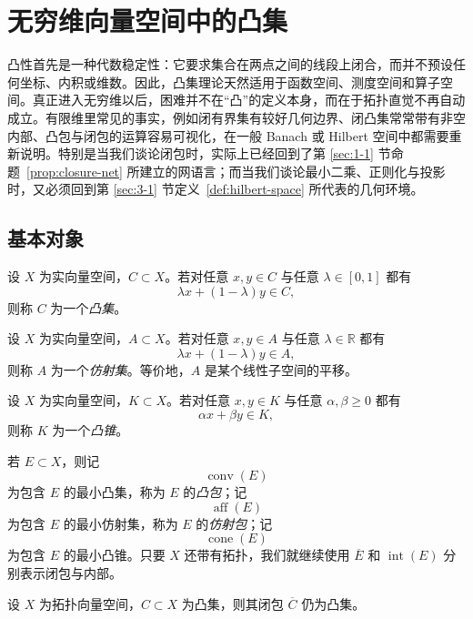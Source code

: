\section{无穷维向量空间中的凸集}

\label{sec:4-1}

凸性首先是一种代数稳定性：它要求集合在两点之间的线段上闭合，而并不预设任何坐标、内积或维数。因此，凸集理论天然适用于函数空间、测度空间和算子空间。真正进入无穷维以后，困难并不在“凸”的定义本身，而在于拓扑直觉不再自动成立。有限维里常见的事实，例如闭有界集有较好几何边界、闭凸集常常带有非空内部、凸包与闭包的运算容易可视化，在一般 Banach 或 Hilbert 空间中都需要重新说明。特别是当我们谈论闭包时，实际上已经回到了第 \ref{sec:1-1} 节命题~\ref{prop:closure-net} 所建立的网语言；而当我们谈论最小二乘、正则化与投影时，又必须回到第 \ref{sec:3-1} 节定义~\ref{def:hilbert-space} 所代表的几何环境。

\subsection{基本对象}

\begin{definition}[凸集]\label{def:convex-set}
设 $X$ 为实向量空间，$C\subset X$。若对任意 $x,y\in C$ 与任意 $\lambda\in[0,1]$ 都有
\[
\lambda x+(1-\lambda)y\in C,
\]
则称 $C$ 为一个\emph{凸集}。
\end{definition}

\begin{definition}[仿射集]\label{def:affine-set}
设 $X$ 为实向量空间，$A\subset X$。若对任意 $x,y\in A$ 与任意 $\lambda\in\mathbb R$ 都有
\[
\lambda x+(1-\lambda)y\in A,
\]
则称 $A$ 为一个\emph{仿射集}。等价地，$A$ 是某个线性子空间的平移。
\end{definition}

\begin{definition}[凸锥]\label{def:convex-cone}
设 $X$ 为实向量空间，$K\subset X$。若对任意 $x,y\in K$ 与任意 $\alpha,\beta\ge 0$ 都有
\[
\alpha x+\beta y\in K,
\]
则称 $K$ 为一个\emph{凸锥}。
\end{definition}

若 $E\subset X$，则记
\[
\operatorname{conv}(E)
\]
为包含 $E$ 的最小凸集，称为 $E$ 的\emph{凸包}；记
\[
\operatorname{aff}(E)
\]
为包含 $E$ 的最小仿射集，称为 $E$ 的\emph{仿射包}；记
\[
\operatorname{cone}(E)
\]
为包含 $E$ 的最小凸锥。只要 $X$ 还带有拓扑，我们就继续使用 $\overline{E}$ 和 $\operatorname{int}(E)$ 分别表示闭包与内部。

\begin{proposition}[闭包保持凸性]\label{prop:convex-closure}
设 $X$ 为拓扑向量空间，$C\subset X$ 为凸集，则其闭包 $\overline{C}$ 仍为凸集。
\end{proposition}

